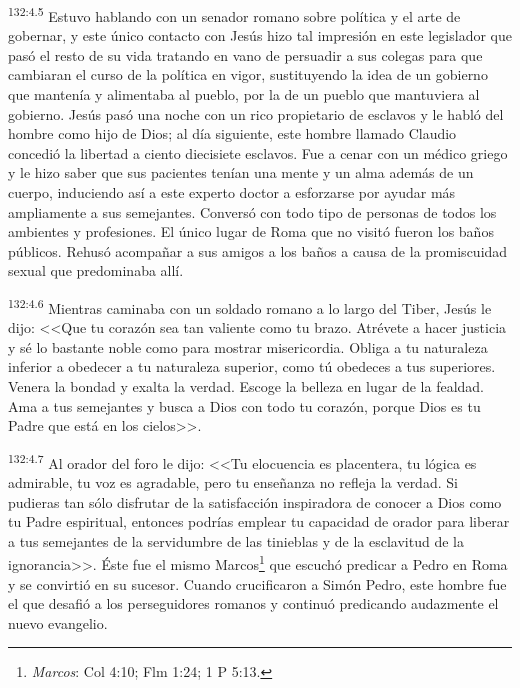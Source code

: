 \par 
\textsuperscript{132:4.5} Estuvo hablando con un senador romano sobre política y el arte de gobernar, y este único contacto con Jesús hizo tal impresión en este legislador que pasó el resto de su vida tratando en vano de persuadir a sus colegas para que cambiaran el curso de la política en vigor, sustituyendo la idea de un gobierno que mantenía y alimentaba al pueblo, por la de un pueblo que mantuviera al gobierno. Jesús pasó una noche con un rico propietario de esclavos y le habló del hombre como hijo de Dios; al día siguiente, este hombre llamado Claudio concedió la libertad a ciento diecisiete esclavos. Fue a cenar con un médico griego y le hizo saber que sus pacientes tenían una mente y un alma además de un cuerpo, induciendo así a este experto doctor a esforzarse por ayudar más ampliamente a sus semejantes. Conversó con todo tipo de personas de todos los ambientes y profesiones. El único lugar de Roma que no visitó fueron los baños públicos. Rehusó acompañar a sus amigos a los baños a causa de la promiscuidad sexual que predominaba allí.

\par 
\textsuperscript{132:4.6} Mientras caminaba con un soldado romano a lo largo del Tiber, Jesús le dijo: <<Que tu corazón sea tan valiente como tu brazo. Atrévete a hacer justicia y sé lo bastante noble como para mostrar misericordia. Obliga a tu naturaleza inferior a obedecer a tu naturaleza superior, como tú obedeces a tus superiores. Venera la bondad y exalta la verdad. Escoge la belleza en lugar de la fealdad. Ama a tus semejantes y busca a Dios con todo tu corazón, porque Dios es tu Padre que está en los cielos>>.

\par 
\textsuperscript{132:4.7} Al orador del foro le dijo: <<Tu elocuencia es placentera, tu lógica es admirable, tu voz es agradable, pero tu enseñanza no refleja la verdad. Si pudieras tan sólo disfrutar de la satisfacción inspiradora de conocer a Dios como tu Padre espiritual, entonces podrías emplear tu capacidad de orador para liberar a tus semejantes de la servidumbre de las tinieblas y de la esclavitud de la ignorancia>>. Éste fue el mismo Marcos\footnote{\textit{Marcos}: Col 4:10; Flm 1:24; 1 P 5:13.} que escuchó predicar a Pedro en Roma y se convirtió en su sucesor. Cuando crucificaron a Simón Pedro, este hombre fue el que desafió a los perseguidores romanos y continuó predicando audazmente el nuevo evangelio.

